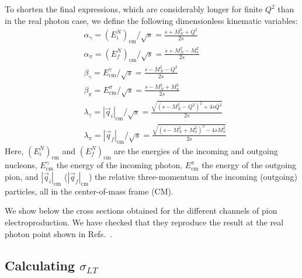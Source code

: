 \documentclass[twocolumn,prc,showpacs,nofootinbib,preprintnumbers,amsmath,amssymb,superscriptaddress]{revtex4-1}
\begin{document}
To shorten the final expressions, which are considerably longer for finite $Q^2$ than in the real photon case, we define the following dimensionless kinematic variables:
\begin{align}
&\alpha_\gamma= (E_i^{N})_\mathrm{cm}/\sqrt{s}=\frac{s+M_N^2+Q^2}{2 s}   \\
&\alpha_\pi= (E_f^{N})_\mathrm{cm}/\sqrt{s} = \frac{s+M_N^2-M_\pi^2}{2 s}  \\              
 & \beta_\gamma = E^{\gamma}_\mathrm{cm}/\sqrt{s} = \frac{s-M_N^2-Q^2}{2 s}   \\
 & \beta_\pi= E^{\pi}_\mathrm{cm}/\sqrt{s} = \frac{s-M_N^2+M_\pi^2}{2 s}  \\
 &\lambda_\gamma  = |\vec{q}_i|_\mathrm{cm}/\sqrt{s}= \frac{\sqrt{(s-M_N^2 - Q^2)^2+4 s Q^2}}{2 s}  \\
&\lambda_\pi =  |\vec{q}_f|_\mathrm{cm}/\sqrt{s}  = \frac{\sqrt{(s-M_N^2 + M_\pi^2)^2-4 s M_\pi^2}}{2 s}  
\end{align} 
Here, $(E_i^{N})_\mathrm{cm}$  and $(E_f^{N})_\mathrm{cm}$ are the energies of the incoming and outgoing nucleons, $E^{\gamma}_\mathrm{cm}$ the energy of the incoming photon, $E^{\pi}_\mathrm{cm}$ the energy of the outgoing pion, and $|\vec{q}_i|_\mathrm{cm}$ ($|\vec{q}_f|_\mathrm{cm}$) the relative three-momentum of the incoming (outgoing) particles, all in the center-of-mass frame (CM).

We show below the cross sections obtained for the different channels of pion electroproduction. 
We have checked that they reproduce the result at the real photon point shown in Refs.~\cite{Lensky:2009uv,Holstein:2005db}.

\subsection{Calculating $\sigma_{LT}$}
\label{App:Extracting-SigmaLT}
\end{document}
